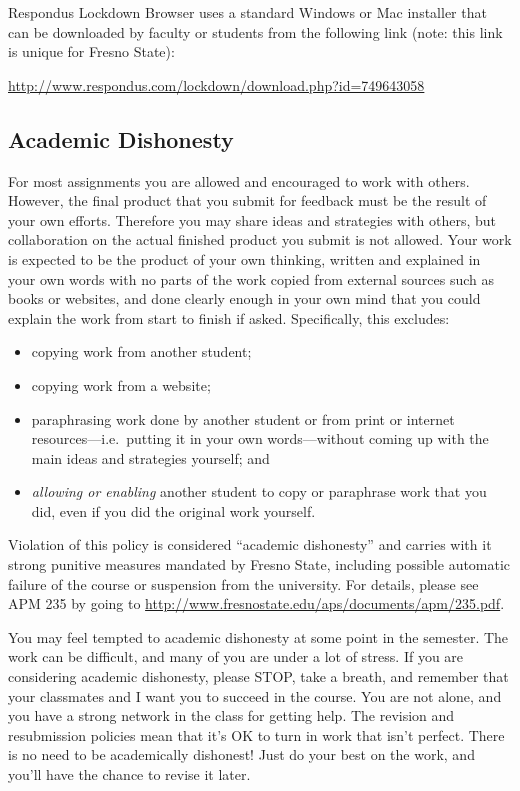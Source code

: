Respondus Lockdown Browser uses a standard Windows or Mac installer that
can be downloaded by faculty or students from the following link (note:
this link is unique for Fresno State):

\url{http://www.respondus.com/lockdown/download.php?id=749643058}

\hypertarget{academic-dishonesty}{%
\subsection{Academic Dishonesty}\label{academic-dishonesty}}

For most assignments you are allowed and encouraged to work with others.
However, the final product that you submit for feedback must be the
result of your own efforts. Therefore you may share ideas and strategies
with others, but collaboration on the actual finished product you submit
is not allowed. Your work is expected to be the product of your own
thinking, written and explained in your own words with no parts of the
work copied from external sources such as books or websites, and done
clearly enough in your own mind that you could explain the work from
start to finish if asked. Specifically, this excludes:

\begin{itemize}
\tightlist
\item
  copying work from another student;
\item
  copying work from a website;
\item
  paraphrasing work done by another student or from print or internet
  resources---i.e.~putting it in your own words---without coming up with
  the main ideas and strategies yourself; and
\item
  \emph{allowing or enabling} another student to copy or paraphrase work
  that you did, even if you did the original work yourself.
\end{itemize}

Violation of this policy is considered ``academic dishonesty'' and
carries with it strong punitive measures mandated by Fresno State,
including possible automatic failure of the course or suspension from
the university. For details, please see APM 235 by going to
\url{http://www.fresnostate.edu/aps/documents/apm/235.pdf}.

You may feel tempted to academic dishonesty at some point in the
semester. The work can be difficult, and many of you are under a lot of
stress. If you are considering academic dishonesty, please STOP, take a
breath, and remember that your classmates and I want you to succeed in
the course. You are not alone, and you have a strong network in the
class for getting help. The revision and resubmission policies mean that
it's OK to turn in work that isn't perfect. There is no need to be
academically dishonest! Just do your best on the work, and you'll have
the chance to revise it later.


